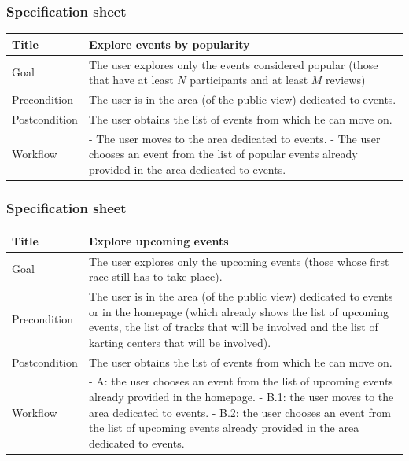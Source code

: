 \documentclass{beamer}
\begin{document}
\begin{frame}
    \frametitle{Specification sheet}
    \begin{table}
        \tiny
        \begin{tabular}{|p{2cm}|p{6cm}|}
        \hline
        Title & \textbf{Explore events by popularity} \\
        \hline
        Goal & The user explores only the events considered popular (those that have
        at least $N$ participants and at least $M$ reviews) \\
        \hline
        Precondition & The user is in the area (of the public view) dedicated to events.\\
        \hline
        Postcondition & The user obtains the list of events from which he can move on.\\
        \hline
        Workflow &
        - The user moves to the area dedicated to events. \newline
        - The user chooses an event from the list of popular events already provided in the area
        dedicated to events. \\
        \hline
        \end{tabular}
\end{table}
\end{frame}

\begin{frame}
    \frametitle{Specification sheet}
    \begin{table}
        \tiny
        \begin{tabular}{|p{2cm}|p{6cm}|}
        \hline
        Title & \textbf{Explore upcoming events} \\
        \hline
        Goal & The user explores only the upcoming events (those whose first race still has to take place). \\
        \hline
        Precondition & The user is in the area (of the public view) dedicated to events or in the homepage (which 
        already shows the list of upcoming events, the list of tracks that will be involved and the list of 
        karting centers that will be involved). \\
        \hline
        Postcondition & The user obtains the list of events from which he can move on.\\
        \hline
        Workflow &
        - A: the user chooses an event from the list of upcoming events already provided in the homepage.\newline
        - B.1: the user moves to the area dedicated to events. \newline
        - B.2: the user chooses an event from the list of upcoming events already provided in the area dedicated
        to events. \\
        \hline
        \end{tabular}
\end{table}
\end{frame}
\end{document}

